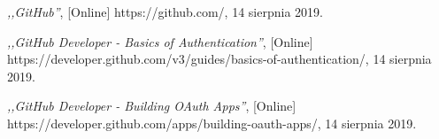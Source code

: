 \begin{thebibliography}{99}
 \emph{,,GitHub''}, [Online] https://github.com/, 14 sierpnia 2019.

 \emph{,,GitHub Developer - Basics of Authentication''}, [Online] https://developer.github.com/v3/guides/basics-of-authentication/, 14 sierpnia 2019.

 \emph{,,GitHub Developer - Building OAuth Apps''}, [Online] https://developer.github.com/apps/building-oauth-apps/, 14 sierpnia 2019.

\end{thebibliography}
\clearpage




